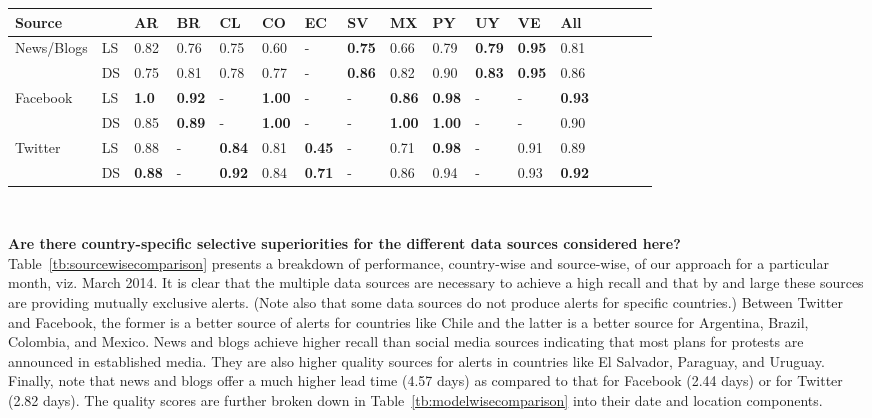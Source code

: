 \documentclass[letterpaper]{article}
\begin{document}
\newpage
\begin{table*} %
  \footnotesize
\centering
\caption{\small Comparing the location and date scores of different sources in specific countries.
AR=Argentina; BR=Brazil; CL=Chile; CO=Colombia; EC=Ecuador;SV=El
Salvador; MX=Mexico; PY=Paraguay; UY=Uruguay; VE=Venezuela. A $-$
indicates that the source did not produce any warnings for that country
in the studied period.} \label{tb:modelwisecomparison}
\begin{tabularx}{.9\textwidth}{p{1.7cm}*{16}{X}}
\toprule
Source& & AR & BR & CL & CO & EC & SV & MX & PY & UY & VE & All\\
\midrule
\multirow{2}{*}{News/Blogs} &LS &0.82&0.76&0.75&0.60&-&{\bf0.75}&0.66&0.79&{\bf0.79}&{\bf0.95}&0.81\\
                            &DS&0.75&0.81&0.78&0.77&-&{\bf0.86}&0.82&0.90&{\bf0.83}&{\bf0.95}&0.86\\
\midrule
\multirow{2}{*}{Facebook} &LS &{\bf1.0}&{\bf0.92}&-&{\bf1.00}&-&-&{\bf0.86}&{\bf0.98}&-&-&{\bf0.93}\\
                          &DS&0.85&{\bf0.89}&-&{\bf1.00}&-&-&{\bf1.00}&{\bf1.00}&-&-&0.90\\
\midrule
\multirow{2}{*}{Twitter} &LS &0.88&-&{\bf0.84}&0.81&{\bf0.45}&-&0.71&{\bf0.98}&-&0.91&0.89\\
                         &DS&{\bf0.88}&-&{\bf0.92}&0.84&{\bf0.71}&-&0.86&0.94&-&0.93&{\bf0.92}\\
\bottomrule
\end{tabularx}
\end{table*}
\newpage
~
\newpage

\noindent
{\bf Are there country-specific selective superiorities for the
different data sources considered here?}
Table~\ref{tb:sourcewisecomparison} presents a breakdown of performance,
country-wise and source-wise, of our approach for a particular month,
viz. March 2014.  It is clear that the multiple data sources are
necessary to achieve a high recall and that by and large these sources
are providing mutually exclusive alerts. (Note also that some data
sources do not produce alerts for specific countries.) Between Twitter
and Facebook, the former is a better source of alerts for countries like
Chile and the latter is a better source for Argentina, Brazil, Colombia,
and Mexico.  News and blogs achieve higher recall than social media
sources indicating that most plans for protests are announced in
established media. They are also higher quality sources for alerts in
countries like El Salvador, Paraguay, and Uruguay.  Finally, note that
news and blogs offer a much higher lead time (4.57 days) as compared to
that for Facebook (2.44 days) or for Twitter (2.82 days). The quality
scores are further broken down in Table~\ref{tb:modelwisecomparison}
into their date and location components.
\end{document}
